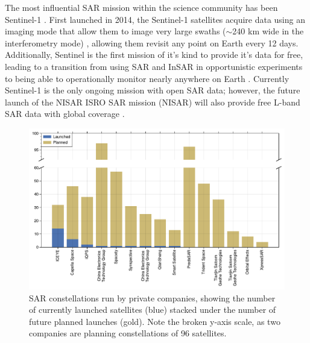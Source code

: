 The most influential SAR mission within the science community has been Sentinel-1 \citep{Torres2012GmesSentinel1}. First launched in 2014, the Sentinel-1 satellites acquire data using an imaging mode that allow them to image very large swaths ($\sim$240 km wide in the interferometry mode) \cite{Zan2006TopsarTerrainObservation}, allowing them revisit any point on Earth every 12 days. 
Additionally, Sentinel is the first mission of it's kind to provide it's data for free, leading to a transition from using SAR and InSAR in opportunistic experiments to being able to operationally monitor nearly anywhere on Earth  \cite{Rosen2021ShiftingGround}.
Currently Sentinel-1 is the only ongoing mission with open SAR data; however, the future launch of the NISAR ISRO SAR mission (NISAR) will also provide free L-band SAR data with global coverage \citep{Rosen2015NasaIsroSar}.


\begin{figure}
	\centering
	\includegraphics[width=1.0\textwidth]{figures/chapter3-sar/sar-private-constellations.pdf}
	\caption[Private sector SAR constellations]{SAR constellations run by private companies, showing the number of currently launched satellites (blue) stacked under the number of future planned launches (gold). Note the broken y-axis scale, as two companies 
		are planning constellations of 96 satellites.
	}
	\label{fig:ch3-sar-private-const}
\end{figure}



